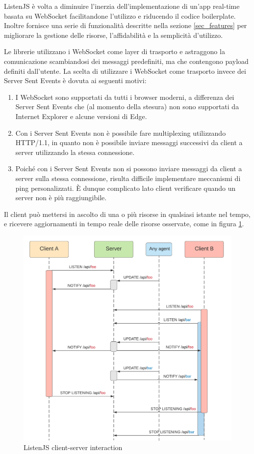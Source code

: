 \documentclass[12pt,a4paper,openright,twoside]{report}
\begin{document}
\bigskip

ListenJS è volta a diminuire l'inerzia dell'implementazione di un'app real-time basata su WebSocket facilitandone l'utilizzo e riducendo il codice boilerplate. Inoltre fornisce una serie di funzionalità descritte nella sezione \ref{sec_features} per migliorare la gestione delle risorse, l'affidabilità e la semplicità d'utilizzo.

\bigskip

Le librerie utilizzano i WebSocket come layer di trasporto e astraggono la comunicazione scambiandosi dei messaggi predefiniti, ma che contengono payload definiti dall'utente.
La scelta di utilizzare i WebSocket come trasporto invece dei Server Sent Events è dovuta ai seguenti motivi:
\begin{enumerate}
\item I WebSocket sono supportati da tutti i browser moderni, a differenza dei Server Sent Events che (al momento della stesura) non sono supportati da Internet Explorer e alcune versioni di Edge.
\item Con i Server Sent Events non è possibile fare multiplexing utilizzando HTTP/1.1, in quanto non è possibile inviare messaggi successivi da client a server utilizzando la stessa connessione.
\item Poiché con i Server Sent Events non si possono inviare messaggi da client a server sulla stessa connessione, risulta difficile implementare meccanismi di ping personalizzati. È dunque complicato lato client verificare quando un server non è più raggiungibile.
\end{enumerate}
Il client può mettersi in ascolto di una o più risorse in qualsiasi istante nel tempo, e ricevere aggiornamenti in tempo reale delle risorse osservate, come in figura \ref{fig:listenjs}.
\begin{figure}[!htbp]
\centering
\includegraphics[width=.7\textwidth]{assets/listenjs.png}
\caption{ListenJS client-server interaction}
\label{fig:listenjs}
\end{figure}
\end{document}
